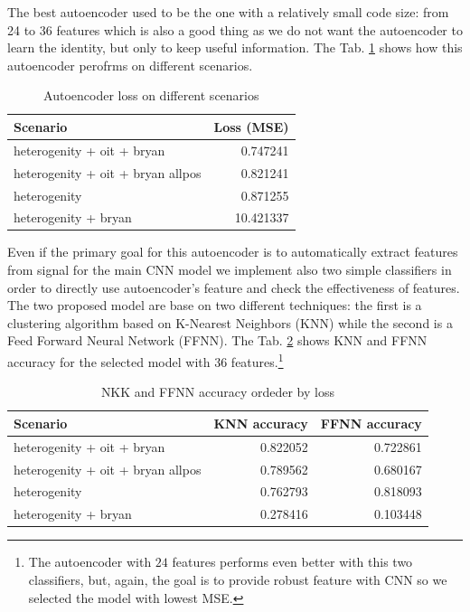 The best autoencoder used to be the one with a relatively small code
size: from 24 to 36 features which is also a good thing as we do not
want the autoencoder to learn the identity, but only to keep useful
information. The Tab. \ref{tab:ae-loss} shows how this autoencoder
perofrms on different scenarios.
\begin{table}
  \centering
  \begin{tabular}{lr} 
    \hline
    Scenario & Loss (MSE) \\ 
    \hline
    heterogenity + oit + bryan & 0.747241 \\
    heterogenity + oit + bryan allpos & 0.821241 \\
    heterogenity & 0.871255 \\
    heterogenity + bryan & 10.421337 \\
    \hline
  \end{tabular}
  \caption{Autoencoder loss on different scenarios}
  \label{tab:ae-loss}
\end{table}

Even if the primary goal for this autoencoder is to automatically
extract features from signal for the main CNN model we implement also
two simple classifiers in order to directly use autoencoder's feature
and check the effectiveness of features. The two proposed model are
base on two different techniques: the first is a clustering algorithm
based on K-Nearest Neighbors (KNN) while the second is a Feed Forward
Neural Network (FFNN). The Tab. \ref{tab:ae-classifiers-accuracy}
shows KNN and FFNN accuracy for the selected model with $36$
features.\footnote{The autoencoder with $24$ features performs even
  better with this two classifiers, but, again, the goal is to provide
  robust feature with CNN so we selected the model with lowest MSE.}
\begin{table}
  \centering
  \begin{tabular}{p{3cm}rr} 
    \hline
    Scenario & KNN accuracy & FFNN accuracy \\ 
    \hline
    heterogenity + oit + bryan & 0.822052  & 0.722861 \\
    heterogenity + oit + bryan allpos &  0.789562 & 0.680167 \\
    heterogenity & 0.762793 & 0.818093 \\
    heterogenity + bryan & 0.278416 & 0.103448 \\
    \hline
  \end{tabular}
  \caption{NKK and FFNN accuracy ordeder by loss}
  \label{tab:ae-classifiers-accuracy}
\end{table}
